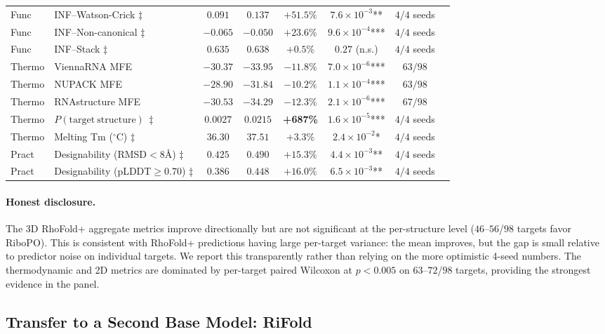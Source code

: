 {{\begin{table}[h]
\begin{tabular}{llcccccc}
Func & INF--Watson-Crick $\ddagger$ & $0.091$ & $0.137$ & $+51.5\%$ & $7.6\!\times\!10^{-3}$** & $4/4$ seeds \\
Func & INF--Non-canonical $\ddagger$ & $-0.065$ & $-0.050$ & $+23.6\%$ & $9.6\!\times\!10^{-4}$*** & $4/4$ seeds \\
Func & INF--Stack $\ddagger$ & $0.635$ & $0.638$ & $+0.5\%$ & $0.27$ (n.s.) & $4/4$ seeds \\
Thermo & ViennaRNA MFE & $-30.37$ & $-33.95$ & $-11.8\%$ & $7.0\!\times\!10^{-6}$*** & $63/98$ \\
Thermo & NUPACK MFE & $-28.90$ & $-31.84$ & $-10.2\%$ & $1.1\!\times\!10^{-4}$*** & $63/98$ \\
Thermo & RNAstructure MFE & $-30.53$ & $-34.29$ & $-12.3\%$ & $2.1\!\times\!10^{-6}$*** & $67/98$ \\
Thermo & $P(\mathrm{target\ structure})\,\ddagger$ & $0.0027$ & $0.0215$ & \textbf{+687\%} & $1.6\!\times\!10^{-5}$*** & $4/4$ seeds \\
Thermo & Melting Tm ($^\circ$C) $\ddagger$ & $36.30$ & $37.51$ & $+3.3\%$ & $2.4\!\times\!10^{-2}$* & $4/4$ seeds \\
Pract & Designability (RMSD$<$8\AA) $\ddagger$ & $0.425$ & $0.490$ & $+15.3\%$ & $4.4\!\times\!10^{-3}$** & $4/4$ seeds \\
Pract & Designability (pLDDT$\geq$0.70) $\ddagger$ & $0.386$ & $0.448$ & $+16.0\%$ & $6.5\!\times\!10^{-3}$** & $4/4$ seeds \\
\bottomrule
\end{tabular}
\end{table}

\paragraph{Honest disclosure.}
The 3D RhoFold+ aggregate metrics improve directionally but are not significant at the per-structure level ($46$--$56$/$98$ targets favor RiboPO). This is consistent with RhoFold+ predictions having large per-target variance: the mean improves, but the gap is small relative to predictor noise on individual targets. We report this transparently rather than relying on the more optimistic 4-seed numbers. The thermodynamic and 2D metrics are dominated by per-target paired Wilcoxon at $p<0.005$ on $63$--$72$/$98$ targets, providing the strongest evidence in the panel.


\subsection{Transfer to a Second Base Model: RiFold}
\label{app:rifold_transfer}

}}
